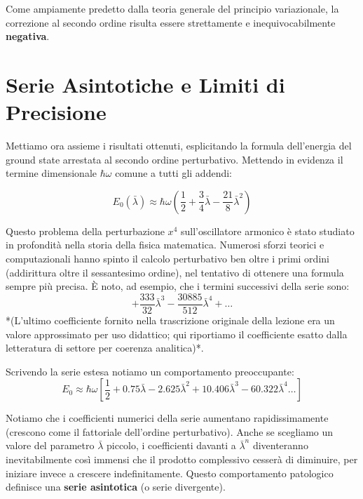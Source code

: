 Come ampiamente predetto dalla teoria generale del principio variazionale, la correzione al secondo ordine risulta essere strettamente e inequivocabilmente \textbf{negativa}.

\section{Serie Asintotiche e Limiti di Precisione}

Mettiamo ora assieme i risultati ottenuti, esplicitando la formula dell'energia del ground state arrestata al secondo ordine perturbativo. Mettendo in evidenza il termine dimensionale $\hbar \omega$ comune a tutti gli addendi:

\begin{equation}
E_0(\bar{\lambda}) \approx \hbar \omega \left( \frac{1}{2} + \frac{3}{4} \bar{\lambda} - \frac{21}{8} \bar{\lambda}^2 \right)
\end{equation}

Questo problema della perturbazione $x^4$ sull'oscillatore armonico è stato studiato in profondità nella storia della fisica matematica. Numerosi sforzi teorici e computazionali hanno spinto il calcolo perturbativo ben oltre i primi ordini (addirittura oltre il sessantesimo ordine), nel tentativo di ottenere una formula sempre più precisa. È noto, ad esempio, che i termini successivi della serie sono:
\begin{equation}
+ \frac{333}{32} \bar{\lambda}^3 - \frac{30885}{512} \bar{\lambda}^4 + \dots
\end{equation}
*(L'ultimo coefficiente fornito nella trascrizione originale della lezione era un valore approssimato per uso didattico; qui riportiamo il coefficiente esatto dalla letteratura di settore per coerenza analitica)*.

Scrivendo la serie estesa notiamo un comportamento preoccupante:
\begin{equation}
E_0 \approx \hbar \omega \left[ \frac{1}{2} + 0.75 \bar{\lambda} - 2.625 \bar{\lambda}^2 + 10.406 \bar{\lambda}^3 - 60.322 \bar{\lambda}^4 \dots \right]
\end{equation}

Notiamo che i coefficienti numerici della serie aumentano rapidissimamente (crescono come il fattoriale dell'ordine perturbativo).
Anche se scegliamo un valore del parametro $\bar{\lambda}$ piccolo, i coefficienti davanti a $\bar{\lambda}^n$ diventeranno inevitabilmente così immensi che il prodotto complessivo cesserà di diminuire, per iniziare invece a crescere indefinitamente. Questo comportamento patologico definisce una \textbf{serie asintotica} (o serie divergente).

